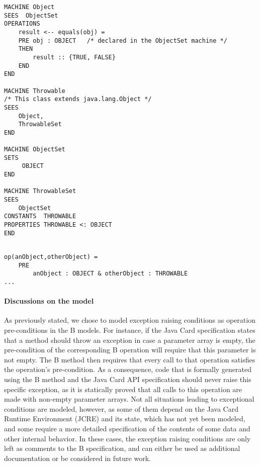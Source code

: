 \documentclass{entcs}
\begin{document}
\begin{lstlisting}
MACHINE Object
SEES  ObjectSet
OPERATIONS
 	result <-- equals(obj) =
	PRE obj : OBJECT   /* declared in the ObjectSet machine */
	THEN
		result :: {TRUE, FALSE}
	END
END

MACHINE Throwable
/* This class extends java.lang.Object */
SEES
    Object,
    ThrowableSet
END

MACHINE ObjectSet
SETS
     OBJECT   
END

MACHINE ThrowableSet
SEES 
    ObjectSet    
CONSTANTS  THROWABLE
PROPERTIES THROWABLE <: OBJECT
END


\end{lstlisting}

\begin{lstlisting}
op(anObject,otherObject) = 
	PRE	
		anObject : OBJECT & otherObject : THROWABLE
...
\end{lstlisting}

\paragraph{Discussions on the model}
As previously stated, we chose to model exception raising conditions
as operation pre-conditions in the B models. For instance, if the Java
Card specification states that a method should throw an exception in
case a parameter array is empty, the pre-condition of the
corresponding B operation will require that this parameter is not
empty. The B method then requires that every call to that operation
satisfies the operation's pre-condition. As a consequence, code that
is formally generated using the B method and the Java Card API
specification should never raise this specific exception, as it is
statically proved that all calls to this operation are made with
non-empty parameter arrays. Not all situations leading to exceptional
conditions are modeled, however, as some of them depend on the Java
Card Runtime Environment (JCRE) and its state, which has not yet been
modeled, and some require a more detailed specification of the
contents of some data and other internal behavior. In these cases, the
exception raising conditions are only left as comments to the B
specification, and can either be used as additional documentation or be
considered in future work.
\end{document}

